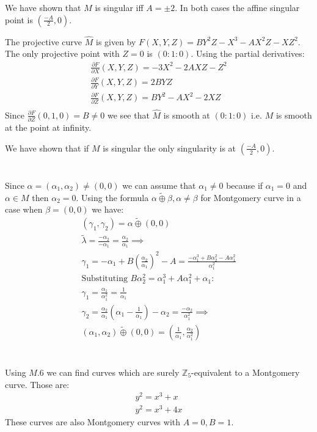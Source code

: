 \documentclass[12pt, a4paper]{article}
\begin{document}
We have shown that $M$ is singular iff $A = \pm 2$. In both cases the affine singular point is $(\frac{-A}{2}, 0)$.

The projective curve $\hat{M}$ is given by $F(X,Y,Z) = BY^2Z-X^3-AX^2Z-XZ^2$. The only projective point with $Z=0$ is $(0:1:0)$. Using the partial derivatives:
\begin{gather*}
\frac{\partial F}{\partial X}(X,Y,Z) = -3X^2-2AXZ-Z^2\\
\frac{\partial F}{\partial Y}(X,Y,Z) = 2BYZ\\
\frac{\partial F}{\partial Z}(X,Y,Z) = BY^2-AX^2-2XZ\\
\end{gather*}
Since $\frac{\partial F}{\partial Z}(0,1,0) = B \neq 0$ we see that $\hat{M}$ is smooth at $(0:1:0)$ i.e. $M$ is smooth at the point at infinity.

We have shown that if $M$ is singular the only singularity is at $(\frac{-A}{2}, 0)$.

\section{}
Since $\alpha = (\alpha_1, \alpha_2) \neq (0,0)$ we can assume that $\alpha_1 \neq 0$ because if $\alpha_1 = 0$ and $\alpha \in M$ then $\alpha_2=0$. Using the formula $\alpha \tilde{\oplus} \beta, \alpha \neq \beta$ for Montgomery curve in a case when $\beta = (0,0)$ we have:
\begin{gather*}
(\gamma_1, \gamma_2) = \alpha \tilde{\oplus} (0,0)\\
\tilde{\lambda} = \frac{-\alpha_2}{-\alpha_1} = \frac{\alpha_2}{\alpha_1} \implies\\
\gamma_1 = -\alpha_1 +B\left(\frac{\alpha_2}{\alpha_1}\right)^2-A = \frac{-\alpha_1^3+B\alpha_2^2-A\alpha_1^2}{\alpha_1^2}\\
\text{Substituting $B\alpha_2^2 = \alpha_1^3+A\alpha_1^2+\alpha_1$:}\\
\gamma_1 = \frac{\alpha_1}{\alpha_1^2} = \frac{1}{\alpha_1}\\
\gamma_2 = \frac{\alpha_2}{\alpha_1}\left(\alpha_1 - \frac{1}{\alpha_1}\right)-\alpha_2 = \frac{-\alpha_2}{\alpha_1^2} \implies\\
(\alpha_1, \alpha_2) \tilde{\oplus} (0,0) = \left(\frac{1}{\alpha_1}, \frac{\alpha_2}{\alpha_1^2}\right)
\end{gather*}

\section{}
Using $M.6$ we can find curves which are surely $\mathbb{Z}_5$-equivalent to a Montgomery curve. Those are:
\begin{gather*}
y^2=x^3+x\\
y^2=x^3+4x
\end{gather*}
These curves are also Montgomery curves with $A=0, B = 1$. 
\end{document}
